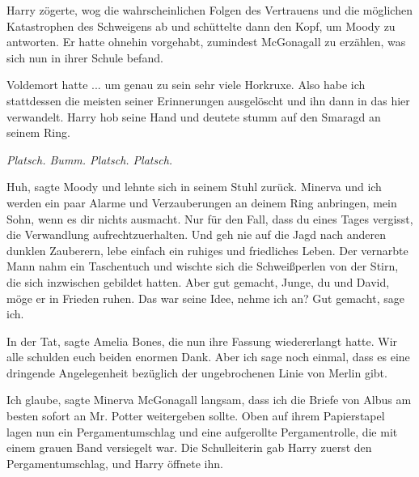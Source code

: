 Harry zögerte, wog die wahrscheinlichen Folgen des Vertrauens und die möglichen
Katastrophen des Schweigens ab und schüttelte dann den Kopf, um Moody zu
antworten. Er hatte ohnehin vorgehabt, zumindest McGonagall zu erzählen, was
sich nun in ihrer Schule befand.

\glqq{}Voldemort hatte ... um genau zu sein sehr viele Horkruxe. Also habe ich
stattdessen die meisten seiner Erinnerungen ausgelöscht und ihn dann in das hier
verwandelt.\grqq{} Harry hob seine Hand und deutete stumm auf den Smaragd an seinem
Ring.

\emph{Platsch. Bumm. Platsch. Platsch.}

\glqq{}Huh\grqq{}, sagte Moody und lehnte sich in seinem Stuhl zurück. \glqq{}
Minerva und ich werden ein paar Alarme und Verzauberungen an deinem Ring
anbringen, mein Sohn, wenn es dir nichts ausmacht. Nur für den Fall, dass du
eines Tages vergisst, die Verwandlung aufrechtzuerhalten. Und geh nie auf die
Jagd nach anderen dunklen Zauberern, lebe einfach ein ruhiges und friedliches
Leben.\grqq{} Der vernarbte Mann nahm ein Taschentuch und wischte sich die
Schweißperlen von der Stirn, die sich inzwischen gebildet hatten. \glqq{}Aber gut
gemacht, Junge, du und David, möge er in Frieden ruhen. Das war seine Idee,
nehme ich an? Gut gemacht, sage ich.\grqq{}

\glqq{}In der Tat\grqq{}, sagte Amelia Bones, die nun ihre Fassung wiedererlangt
hatte. \glqq{}Wir alle schulden euch beiden enormen Dank. Aber ich sage noch
einmal, dass es eine dringende Angelegenheit bezüglich der ungebrochenen Linie
von Merlin gibt.\grqq{}

\glqq{}Ich glaube\grqq{}, sagte Minerva McGonagall langsam, \glqq{}dass ich die
Briefe von Albus am besten sofort an Mr. Potter weitergeben sollte.\grqq{} Oben auf
ihrem Papierstapel lagen nun ein Pergamentumschlag und eine aufgerollte
Pergamentrolle, die mit einem grauen Band versiegelt war. Die Schulleiterin gab
Harry zuerst den Pergamentumschlag, und Harry öffnete ihn.


